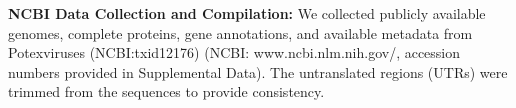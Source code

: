\documentclass{article}
\begin{document}


\textbf{NCBI Data Collection and Compilation:}
We collected publicly available genomes, complete proteins, gene annotations, and available metadata from Potexviruses (NCBI:txid12176) (NCBI: www.ncbi.nlm.nih.gov/, accession numbers provided in Supplemental Data). 
The untranslated regions (UTRs) were trimmed from the sequences to provide consistency.
\end{document}
